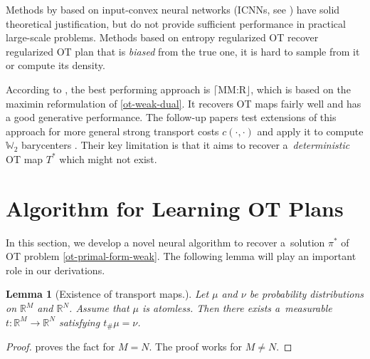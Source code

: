 \documentclass{article} %
\newtheorem{lemma}{Lemma}
\begin{document}
\vspace{-0.7mm}Methods by \citep{taghvaei20192,makkuva2019optimal,korotin2019wasserstein,korotin2021continuous} based on input-convex neural networks (ICNNs, see \citep{amos2017input}) have solid theoretical justification, but do not provide sufficient performance in practical large-scale problems. Methods based on entropy regularized OT \citep{genevay2016stochastic,seguy2017large,daniels2021score} recover regularized OT plan that is \textit{biased} from the true one, it is hard to sample from it or compute its density.

\vspace{-0.7mm}According to \citep{korotin2021neural}, the best performing approach is $\lceil \text{MM:R}\rfloor$, which is based on the maximin reformulation of \eqref{ot-weak-dual}. It recovers OT maps fairly well and has a good generative performance. The follow-up papers \citep{rout2022generative,fan2022scalable} test extensions of this approach for more general strong transport costs $c(\cdot,\cdot)$ and apply it to compute $\mathbb{W}_{2}$ barycenters \citep{korotin2022wasserstein}. Their key limitation is that it aims to recover a~\textit{deterministic} OT map $T^{*}$ which might not exist.

\vspace{-2mm}\section{Algorithm for Learning OT Plans}

\vspace{-1mm}In this section, we develop a novel neural algorithm to recover a~solution $\pi^{*}$ of OT problem \eqref{ot-primal-form-weak}. The following lemma will play an important role in our derivations.

\begin{lemma}[Existence of transport maps.] Let $\mu$ and $\nu$ be probability distributions on $\mathbb{R}^{M}$ and $\mathbb{R}^{N}$. Assume that $\mu$ is atomless. Then there  exists a~measurable $t\!:\!\mathbb{R}^{M}\!\rightarrow\!\mathbb{R}^{N}$ satisfying $t_{\#}\mu=\nu$.
\label{lemma-existence-transport}
\end{lemma}

\vspace{-3.7mm}\begin{proof}
\citep[Cor. 1.29]{santambrogio2015optimal} proves the fact for $M\!=\!N$. The proof works for $M\!\neq\!N$.\hspace{-3mm}
\end{proof}
\end{document}
